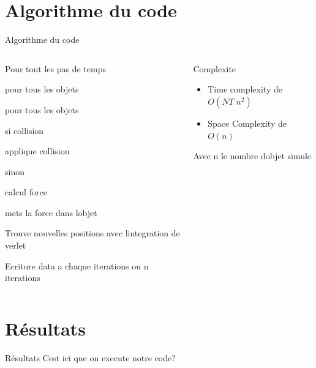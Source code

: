 \documentclass[aspectratio=169,xcolor=dvipsnames]{beamer}
\begin{document}
\section{Algorithme du code}
\begin{frame}{Algorithme du code}
    \begin{columns}
        \begin{column}[]{0.7\textwidth}
            \begin{itemize}
                \item[] Pour tout les pas de temps 
                {\setlength\itemindent{15pt} \item[] pour tous les objets}
                {\setlength\itemindent{30pt} \item[] pour tous les objets }
                {\setlength\itemindent{45pt} \item[] si collision }
                {\setlength\itemindent{60pt} \item[] applique collision}
                {\setlength\itemindent{45pt} \item[] sinon}
                {\setlength\itemindent{60pt} \item[] calcul force}
                {\setlength\itemindent{15pt} \item[] mets la force dans lobjet}
                \item[] Trouve nouvelles positions avec lintegration de verlet 
                \item[] Ecriture data a chaque iterations ou n iterations
            \end{itemize}
        \end{column}
        \begin{column}[]{0.35\textwidth}
            \begin{block}{Complexite}
                \begin{itemize}
                    \item Time complexity de $O(NT\;n^2)$ 
                    \item Space Complexity de $O(n)$
                \end{itemize}
                Avec n le nombre dobjet simule
            \end{block}
        \end{column}
    \end{columns}
\end{frame}

\section{Résultats}
\begin{frame}{Résultats}
    Cest ici que on execute notre code?
\end{frame}
\end{document}
